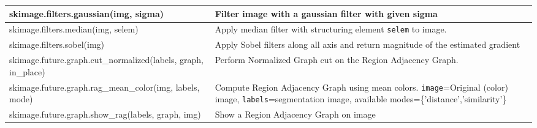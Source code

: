 \begin{tabularx}{\textwidth}{t{8cm} X}
    skimage.filters.gaussian(img, sigma)                                                               & Filter image with a gaussian filter with given sigma                                                                                                                                             \\\hline
    skimage.filters.median(img, selem)                                                                 & Apply median filter with structuring element \texttt{selem} to image.                                                                                                                            \\\hline
    skimage.filters.sobel(img)                                                                         & Apply Sobel filters along all axis and return magnitude of the estimated gradient                                                                                                                \\\hline

    skimage.future.graph.cut\_normalized(labels, graph, in\_place)                                     & Perform Normalized Graph cut on the Region Adjacency Graph.                                                                                                                                      \\\hline
    skimage.future.graph.rag\_mean\_color(img, labels, mode)                                           & Compute Region Adjacency Graph using mean colors. \texttt{image}=Original (color) image, \texttt{labels}=segmentation image, available modes=\{'distance','similarity'\}                         \\\hline
    skimage.future.graph.show\_rag(labels, graph, img)                                                 & Show a Region Adjacency Graph on image                                                                                                                                                           \\\hline


\end{tabularx}

